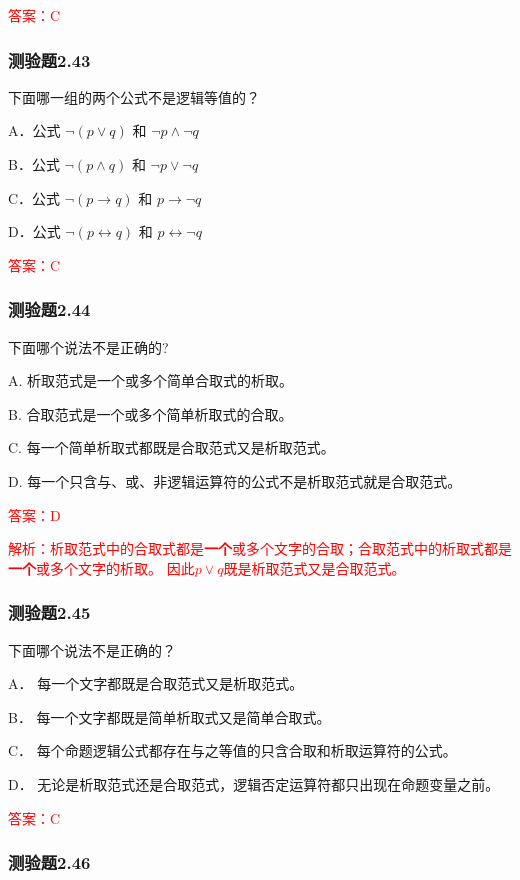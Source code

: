 \documentclass[UTF8, heading=true]{ctexart}
\begin{document}
\textcolor{red}{答案：C}

\subsubsection{测验题2.43}

下面哪一组的两个公式不是逻辑等值的？

A．公式 $\neg(p \vee q)$ 和 $\neg p \wedge \neg q$

B．公式 $\neg(p \wedge q)$ 和 $\neg p \vee \neg q$

C．公式 $\neg(p \rightarrow q)$ 和 $p \rightarrow \neg q$

D．公式 $\neg(p \leftrightarrow q)$ 和 $p \leftrightarrow \neg q$

\textcolor{red}{答案：C}

\subsubsection{测验题2.44}

下面哪个说法不是正确的?

A. 析取范式是一个或多个简单合取式的析取。

B. 合取范式是一个或多个简单析取式的合取。

C. 每一个简单析取式都既是合取范式又是析取范式。

D. 每一个只含与、或、非逻辑运算符的公式不是析取范式就是合取范式。

\textcolor{red}{答案：D}

\textcolor{red}{解析：析取范式中的合取式都是\textbf{一个}或多个文字的合取；合取范式中的析取式都是\textbf{一个}或多个文字的析取。
因此$p \vee q$既是析取范式又是合取范式。}

\subsubsection{测验题2.45}

下面哪个说法不是正确的？

A．
每一个文字都既是合取范式又是析取范式。

B．
每一个文字都既是简单析取式又是简单合取式。

C．
每个命题逻辑公式都存在与之等值的只含合取和析取运算符的公式。

D．
无论是析取范式还是合取范式，逻辑否定运算符都只出现在命题变量之前。

\textcolor{red}{答案：C}

\subsubsection{测验题2.46}
\end{document}
